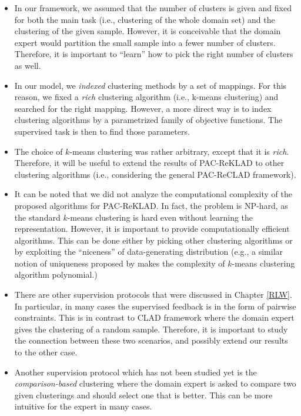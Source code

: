 \documentclass[letterpaper,12pt,titlepage,oneside,final]{book}
\begin{document}
\begin{itemize}




\item In our framework, we assumed that the number of clusters is given and fixed for both the main task (i.e., clustering of the whole domain set) and the clustering of the given sample. However, it is conceivable that the domain expert would partition the small sample into a fewer number of clusters. Therefore, it is important to ``learn'' how to pick the right number of clusters as well.

\item In our model, we \emph{indexed} clustering methods by a set of mappings. For this reason, we fixed a \emph{rich} clustering algorithm (i.e., k-means clustering) and searched for the right mapping. However, a more direct way is to index clustering algorithms by a parametrized family of objective functions. The supervised task is then to find those parameters.

\item The choice of $k$-means clustering was rather arbitrary, except that it is \emph{rich}. Therefore, it will be useful to extend the results of PAC-ReKLAD to other clustering algorithms (i.e., considering the general PAC-ReCLAD framework).



\item It can be noted that we did not analyze the computational complexity of the proposed algorithms for PAC-ReKLAD. In fact, the problem is NP-hard, as the standard $k$-means clustering is hard even without learning the representation. However, it is important to provide computationally efficient algorithms. This can be done either by picking other clustering algorithms or by exploiting the ``niceness'' of data-generating distribution (e.g., a similar notion of uniqueness proposed by \cite{balcan2009approximate} makes the complexity of $k$-means clustering algorithm polynomial.)

\item There are other supervision protocols that were discussed in Chapter \ref{RLW}. In particular, in many cases the supervised feedback is in the form of pairwise constraints. This is in contrast to CLAD framework where the domain expert gives the clustering of a random sample. Therefore, it is important to study the connection between these two scenarios, and possibly extend our results to the other case.

\item Another supervision protocol which has not been studied yet is the \emph{comparison-based} clustering where the domain expert is asked to compare two given clusterings and should select one  that is better. This can be more intuitive for the expert in many cases.


\end{itemize}
\end{document}
